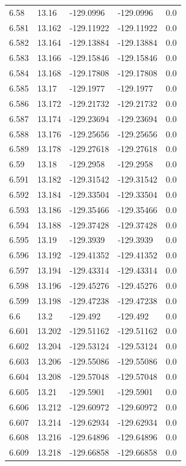\begin{tabular}{lllll}
6.58 & 13.16 & -129.0996 & -129.0996 & 0.0 \\
6.581 & 13.162 & -129.11922 & -129.11922 & 0.0 \\
6.582 & 13.164 & -129.13884 & -129.13884 & 0.0 \\
6.583 & 13.166 & -129.15846 & -129.15846 & 0.0 \\
6.584 & 13.168 & -129.17808 & -129.17808 & 0.0 \\
6.585 & 13.17 & -129.1977 & -129.1977 & 0.0 \\
6.586 & 13.172 & -129.21732 & -129.21732 & 0.0 \\
6.587 & 13.174 & -129.23694 & -129.23694 & 0.0 \\
6.588 & 13.176 & -129.25656 & -129.25656 & 0.0 \\
6.589 & 13.178 & -129.27618 & -129.27618 & 0.0 \\
6.59 & 13.18 & -129.2958 & -129.2958 & 0.0 \\
6.591 & 13.182 & -129.31542 & -129.31542 & 0.0 \\
6.592 & 13.184 & -129.33504 & -129.33504 & 0.0 \\
6.593 & 13.186 & -129.35466 & -129.35466 & 0.0 \\
6.594 & 13.188 & -129.37428 & -129.37428 & 0.0 \\
6.595 & 13.19 & -129.3939 & -129.3939 & 0.0 \\
6.596 & 13.192 & -129.41352 & -129.41352 & 0.0 \\
6.597 & 13.194 & -129.43314 & -129.43314 & 0.0 \\
6.598 & 13.196 & -129.45276 & -129.45276 & 0.0 \\
6.599 & 13.198 & -129.47238 & -129.47238 & 0.0 \\
6.6 & 13.2 & -129.492 & -129.492 & 0.0 \\
6.601 & 13.202 & -129.51162 & -129.51162 & 0.0 \\
6.602 & 13.204 & -129.53124 & -129.53124 & 0.0 \\
6.603 & 13.206 & -129.55086 & -129.55086 & 0.0 \\
6.604 & 13.208 & -129.57048 & -129.57048 & 0.0 \\
6.605 & 13.21 & -129.5901 & -129.5901 & 0.0 \\
6.606 & 13.212 & -129.60972 & -129.60972 & 0.0 \\
6.607 & 13.214 & -129.62934 & -129.62934 & 0.0 \\
6.608 & 13.216 & -129.64896 & -129.64896 & 0.0 \\
6.609 & 13.218 & -129.66858 & -129.66858 & 0.0 \\

\end{tabular}
